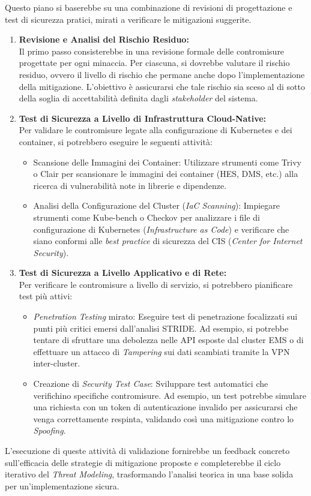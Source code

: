 Questo piano si baserebbe su una combinazione di revisioni di progettazione e test di sicurezza pratici, mirati a verificare le mitigazioni suggerite.

\begin{enumerate}
    \item \textbf{Revisione e Analisi del Rischio Residuo:}
    \\Il primo passo consisterebbe in una revisione formale delle contromisure progettate per ogni minaccia. Per ciascuna, si dovrebbe valutare il rischio residuo, ovvero il livello di rischio che permane anche dopo l'implementazione della mitigazione. L'obiettivo è assicurarsi che tale rischio sia sceso al di sotto della soglia di accettabilità definita dagli \textit{stakeholder} del sistema.
    \item \textbf{Test di Sicurezza a Livello di Infrastruttura Cloud-Native:}
    \\Per validare le contromisure legate alla configurazione di Kubernetes e dei container, si potrebbero eseguire le seguenti attività:
    \begin{itemize}
        \item Scansione delle Immagini dei Container: Utilizzare strumenti come Trivy o Clair per scansionare le immagini dei container (HES, DMS, etc.) alla ricerca di vulnerabilità note in librerie e dipendenze.
        \item Analisi della Configurazione del Cluster (\textit{IaC Scanning}): Impiegare strumenti come Kube-bench o Checkov per analizzare i file di configurazione di Kubernetes (\textit{Infrastructure as Code}) e verificare che siano conformi alle \textit{best practice} di sicurezza del CIS (\textit{Center for Internet Security}).
    \end{itemize}
    \item \textbf{Test di Sicurezza a Livello Applicativo e di Rete:}
    \\Per verificare le contromisure a livello di servizio, si potrebbero pianificare test più attivi:
    \begin{itemize}
        \item \textit{Penetration Testing} mirato: Eseguire test di penetrazione focalizzati sui punti più critici emersi dall'analisi STRIDE. Ad esempio, si potrebbe tentare di sfruttare una debolezza nelle API esposte dal cluster EMS o di effettuare un attacco di \textit{Tampering} sui dati scambiati tramite la VPN inter-cluster.
        \item Creazione di \textit{Security Test Case}: Sviluppare test automatici che verifichino specifiche contromisure. Ad esempio, un test potrebbe simulare una richiesta con un token di autenticazione invalido per assicurarsi che venga correttamente respinta, validando così una mitigazione contro lo \textit{Spoofing}.
    \end{itemize}
\end{enumerate}


L'esecuzione di queste attività di validazione fornirebbe un feedback concreto sull'efficacia delle strategie di mitigazione proposte e completerebbe il ciclo iterativo del \textit{Threat Modeling}, trasformando l'analisi teorica in una base solida per un'implementazione sicura.